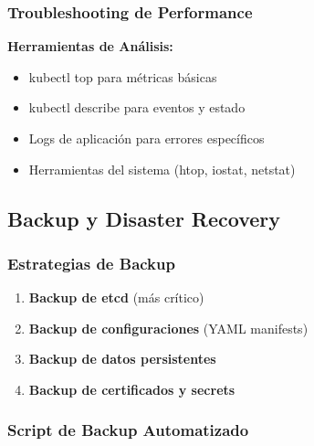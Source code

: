 \documentclass[11pt,a4paper]{article}
\begin{document}
\subsubsection{Troubleshooting de Performance}

\begin{tipbox}
\textbf{Herramientas de Análisis:}
\begin{itemize}
    \item kubectl top para métricas básicas
    \item kubectl describe para eventos y estado
    \item Logs de aplicación para errores específicos
    \item Herramientas del sistema (htop, iostat, netstat)
\end{itemize}
\end{tipbox}

\subsection{Backup y Disaster Recovery}

\subsubsection{Estrategias de Backup}

\begin{enumerate}
    \item \textbf{Backup de etcd} (más crítico)
    \item \textbf{Backup de configuraciones} (YAML manifests)
    \item \textbf{Backup de datos persistentes}
    \item \textbf{Backup de certificados y secrets}
\end{enumerate}

\subsubsection{Script de Backup Automatizado}
\end{document}
